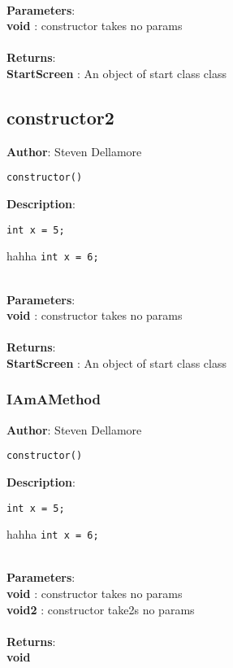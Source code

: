 \documentclass[12pt]{article}
\begin{document}
\textbf{\large{\\Parameters}}:\\
\textbf{void }: constructor takes no params\\\textbf{\large{\\Returns}}:\\
\textbf{StartScreen }: An object of start class class\\

\subsection{constructor2}
\textbf{Author}: Steven Dellamore 
\vspace*{1\baselineskip}
\begin{lstlisting}
constructor()
\end{lstlisting} 
\vspace*{1\baselineskip}
\textbf{Description}: 
\begin{verbatim}
int x = 5; 
\end{verbatim}
 hahha \texttt{int x = 6;} 


\textbf{\large{\\Parameters}}:\\
\textbf{void }: constructor takes no params\\\textbf{\large{\\Returns}}:\\
\textbf{StartScreen }: An object of start class class\\

\subsubsection{IAmAMethod}
\textbf{Author}: Steven Dellamore 
\vspace*{1\baselineskip}
\begin{lstlisting}
constructor()
\end{lstlisting} 
\vspace*{1\baselineskip}
\textbf{Description}: 
\begin{verbatim}
int x = 5; 
\end{verbatim}
 hahha \texttt{int x = 6;} 


\textbf{\large{\\Parameters}}:\\
\textbf{void }: constructor takes no params\\
\textbf{void2 }: constructor take2s no params\\\textbf{\large{\\Returns}}:\\
\textbf{void}
\end{document}
